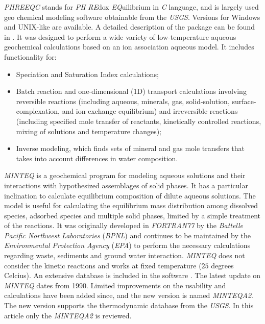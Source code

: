 \documentclass[preprint,12pt,3p]{elsarticle}
\begin{document}
\emph{PHREEQC} stands for \emph{PH} \emph{RE}dox \emph{EQ}uilibrium in \emph{C} language, and is largely used geo chemical modeling software obtainable from the \emph{USGS}. Versions for Windows and UNIX-like are available. A detailed description of the package can be found in \cite{Parkhurst:95}. It was designed to perform a wide variety of low-temperature aqueous geochemical calculations based on an ion association aqueous model. It includes functionality for:
\begin{itemize}
\item Speciation and Saturation Index calculations;
\item Batch reaction and one-dimensional (1D) transport calculations involving reversible reactions (including aqueous, minerals, gas, solid-solution, surface-complexation, and ion-exchange equilibrium) and irreversible reactions (including specified mole transfer of reactants, kinetically controlled reactions, mixing of solutions and temperature changes);
\item Inverse modeling, which finds sets of mineral and gas mole transfers that takes into account differences in water composition.
\end{itemize}

\emph{MINTEQ} \cite{Felmy:84}  is a geochemical program for modeling aqueous solutions and their interactions with hypothesized assemblages of solid phases. It has a particular inclination to calculate equilibrium composition of dilute aqueous solutions. The model is useful for calculating the equilibrium mass distribution among dissolved species, adsorbed species and multiple solid phases, limited by a simple treatment of the reactions. It was originally developed in \emph{FORTRAN77} by the \emph{Battelle Pacific Northwest Laboratories} (\emph{BPNL}) and continues to be maintained by the \emph{Environmental Protection Agency} (\emph{EPA}) to perform the necessary calculations regarding waste, sediments and ground water interaction. \emph{MINTEQ} does not consider the kinetic reactions and works at fixed temperature ($25$ degrees Celcius). An extensive database is included in the software \cite{Brown:87} \cite{Allison:91}. 
The latest update on \emph{MINTEQ} dates from 1990. Limited improvements on the usability and calculations have been added since, and the new version is named \emph{MINTEQA2}. The new version supports the thermodynamic database from the \emph{USGS}. In this article only the \emph{MINTEQA2} is reviewed.
\end{document}
